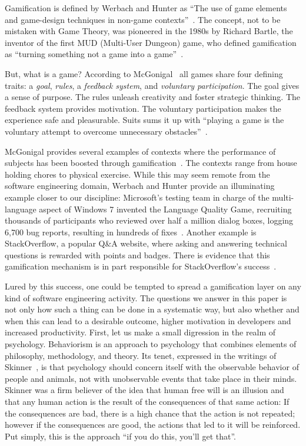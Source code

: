 Gamification is defined by Werbach and Hunter as ``The use of game elements and game-design techniques in non-game contexts''~\cite{Werb2012a}.
The concept, not to be mistaken with Game Theory, was pioneered in the 1980s by Richard Bartle, the inventor of the first MUD (Multi-User Dungeon) game, who defined gamification as ``turning something not a game into a game''~\cite{Bart2003a}.

But, what is a game? According to McGonigal~\cite{McGo2011a} all games share four defining traits: a \emph{goal}, \emph{rules}, a \emph{feedback system}, and \emph{voluntary participation}.
The goal gives a sense of purpose.
The rules unleash creativity and foster strategic thinking.
The feedback system provides motivation.
The voluntary participation makes the experience safe and pleasurable.
Suits sums it up with ``playing a game is the voluntary attempt to overcome unnecessary obstacles''~\cite{Suit2005a}.

McGonigal provides several examples of contexts where the performance of subjects has been boosted through gamification~\cite{McGo2011a}.
The contexts range from house holding chores to physical exercise.
While this may seem remote from the software engineering domain, Werbach and Hunter provide an illuminating example closer to our discipline: Microsoft's testing team in charge of the multi-language aspect of Windows 7 invented the Language Quality Game, recruiting thousands of participants who reviewed over half a million dialog boxes, logging 6,700 bug reports, resulting in hundreds of fixes~\cite{Werb2012a}.
Another example is StackOverflow, a popular Q\&A website, where asking and answering technical questions is rewarded with points and badges.
There is evidence that this gamification mechanism is in part responsible for StackOverflow's success~\cite{Vasil2013a}.

Lured by this success, one could be tempted to spread a gamification layer on any kind of software engineering activity.
The questions we answer in this paper is not only how such a thing can be done in a systematic way, but also whether and when this can lead to a desirable outcome, \ie higher motivation in developers and increased productivity.
First, let us make a small digression in the realm of psychology.
Behaviorism is an approach to psychology that combines elements of philosophy, methodology, and theory.
Its tenet, expressed in the writings of Skinner~\cite{Skin1978a}, is that psychology should concern itself with the observable behavior of people and animals, not with unobservable events that take place in their minds.
Skinner was a firm believer of the idea that human free will is an illusion and that any human action is the result of the consequences of that same action: If the consequences are bad, there is a high chance that the action is not repeated; however if the consequences are good, the actions that led to it will be reinforced.
Put simply, this is the approach ``if you do this, you'll get that''.


